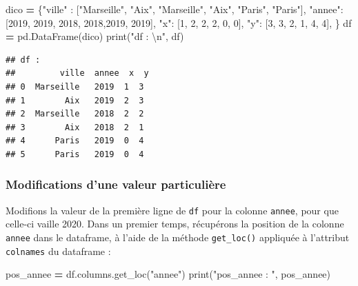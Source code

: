 \documentclass[
  12pt,
]{book}
\newenvironment{Shaded}{\begin{snugshade}}{\end{snugshade}}
\newcommand{\BuiltInTok}[1]{#1}
\newcommand{\CharTok}[1]{\textcolor[rgb]{0.31,0.60,0.02}{#1}}
\newcommand{\DecValTok}[1]{\textcolor[rgb]{0.00,0.00,0.81}{#1}}
\newcommand{\NormalTok}[1]{#1}
\newcommand{\OperatorTok}[1]{\textcolor[rgb]{0.81,0.36,0.00}{\textbf{#1}}}
\newcommand{\StringTok}[1]{\textcolor[rgb]{0.31,0.60,0.02}{#1}}
\numberwithin{equation}{section}
\numberwithin{countremarque}{section}
\begin{document}
\begin{Shaded}
\begin{Highlighting}[]
\NormalTok{dico }\OperatorTok{=}\NormalTok{ \{}\StringTok{"ville"}\NormalTok{ : [}\StringTok{"Marseille"}\NormalTok{, }\StringTok{"Aix"}\NormalTok{,}
                   \StringTok{"Marseille"}\NormalTok{, }\StringTok{"Aix"}\NormalTok{, }\StringTok{"Paris"}\NormalTok{, }\StringTok{"Paris"}\NormalTok{],}
        \StringTok{"annee"}\NormalTok{: [}\DecValTok{2019}\NormalTok{, }\DecValTok{2019}\NormalTok{, }\DecValTok{2018}\NormalTok{, }\DecValTok{2018}\NormalTok{,}\DecValTok{2019}\NormalTok{, }\DecValTok{2019}\NormalTok{],}
        \StringTok{"x"}\NormalTok{: [}\DecValTok{1}\NormalTok{, }\DecValTok{2}\NormalTok{, }\DecValTok{2}\NormalTok{, }\DecValTok{2}\NormalTok{, }\DecValTok{0}\NormalTok{, }\DecValTok{0}\NormalTok{],}
        \StringTok{"y"}\NormalTok{: [}\DecValTok{3}\NormalTok{, }\DecValTok{3}\NormalTok{, }\DecValTok{2}\NormalTok{, }\DecValTok{1}\NormalTok{, }\DecValTok{4}\NormalTok{, }\DecValTok{4}\NormalTok{],}
\NormalTok{       \} }
\NormalTok{df }\OperatorTok{=}\NormalTok{ pd.DataFrame(dico)}
\BuiltInTok{print}\NormalTok{(}\StringTok{"df : }\CharTok{\textbackslash{}n}\StringTok{"}\NormalTok{, df)}
\end{Highlighting}
\end{Shaded}

\begin{lstlisting}
## df : 
##         ville  annee  x  y
## 0  Marseille   2019  1  3
## 1        Aix   2019  2  3
## 2  Marseille   2018  2  2
## 3        Aix   2018  2  1
## 4      Paris   2019  0  4
## 5      Paris   2019  0  4
\end{lstlisting}

\subsubsection{Modifications d'une valeur particulière}\label{modifications-dune-valeur-particuliuxe8re}

Modifions la valeur de la première ligne de \texttt{df} pour la colonne \texttt{annee}, pour que celle-ci vaille 2020. Dans un premier temps, récupérons la position de la colonne \texttt{annee} dans le dataframe, à l'aide de la méthode \texttt{get\_loc()} appliquée à l'attribut \texttt{colnames} du dataframe :

\begin{Shaded}
\begin{Highlighting}[]
\NormalTok{pos\_annee }\OperatorTok{=}\NormalTok{ df.columns.get\_loc(}\StringTok{"annee"}\NormalTok{)}
\BuiltInTok{print}\NormalTok{(}\StringTok{"pos\_annee : "}\NormalTok{, pos\_annee)}
\end{Highlighting}
\end{Shaded}
\end{document}

